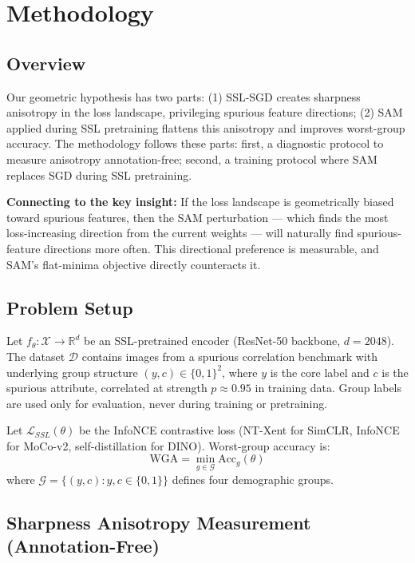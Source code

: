\section{Methodology}
\label{sec:method}

\subsection{Overview}

Our geometric hypothesis has two parts: (1) SSL-SGD creates sharpness anisotropy in the loss landscape, privileging spurious feature directions; (2) SAM applied during SSL pretraining flattens this anisotropy and improves worst-group accuracy. The methodology follows these parts: first, a diagnostic protocol to measure anisotropy annotation-free; second, a training protocol where SAM replaces SGD during SSL pretraining.

\textbf{Connecting to the key insight:} If the loss landscape is geometrically biased toward spurious features, then the SAM perturbation --- which finds the most loss-increasing direction from the current weights --- will naturally find spurious-feature directions more often. This directional preference is measurable, and SAM's flat-minima objective directly counteracts it.

\subsection{Problem Setup}

Let $f_\theta: \mathcal{X} \to \mathbb{R}^d$ be an SSL-pretrained encoder (ResNet-50 backbone, $d=2048$). The dataset $\mathcal{D}$ contains images from a spurious correlation benchmark with underlying group structure $(y, c) \in \{0,1\}^2$, where $y$ is the core label and $c$ is the spurious attribute, correlated at strength $p \approx 0.95$ in training data. Group labels are used only for evaluation, never during training or pretraining.

Let $\mathcal{L}_{SSL}(\theta)$ be the InfoNCE contrastive loss (NT-Xent for SimCLR, InfoNCE for MoCo-v2, self-distillation for DINO). Worst-group accuracy is:
\begin{equation}
\text{WGA} = \min_{g \in \mathcal{G}} \text{Acc}_g(\theta)
\end{equation}
where $\mathcal{G} = \{(y,c) : y,c \in \{0,1\}\}$ defines four demographic groups.

\subsection{Sharpness Anisotropy Measurement (Annotation-Free)}

